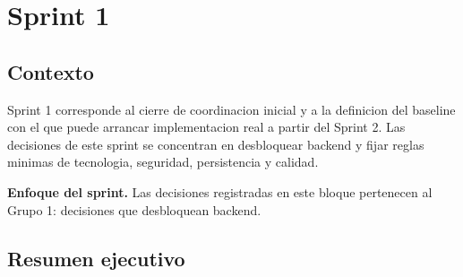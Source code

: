 \section{Sprint 1}

\subsection{Contexto}

Sprint 1 corresponde al cierre de coordinacion inicial y a la definicion del baseline con el que puede arrancar implementacion real a partir del Sprint 2. Las decisiones de este sprint se concentran en desbloquear backend y fijar reglas minimas de tecnologia, seguridad, persistencia y calidad.

\begin{docnote}
\textbf{Enfoque del sprint.} Las decisiones registradas en este bloque pertenecen al Grupo 1: decisiones que desbloquean backend.
\end{docnote}

\subsection{Resumen ejecutivo}

